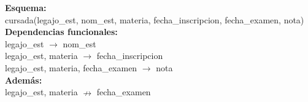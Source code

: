 \documentclass[preview]{standalone}
\begin{document}
\textbf{Esquema:}\\
cursada(legajo\_est, nom\_est, materia, fecha\_inscripcion, fecha\_examen, nota)\\

\textbf{Dependencias funcionales:}\\
legajo\_est $\rightarrow$ nom\_est\\
legajo\_est, materia $\rightarrow$ fecha\_inscripcion\\
legajo\_est, materia, fecha\_examen $\rightarrow$ nota\\

\textbf{Adem\'as:}\\
legajo\_est, materia $\nrightarrow$ fecha\_examen
\end{document}

